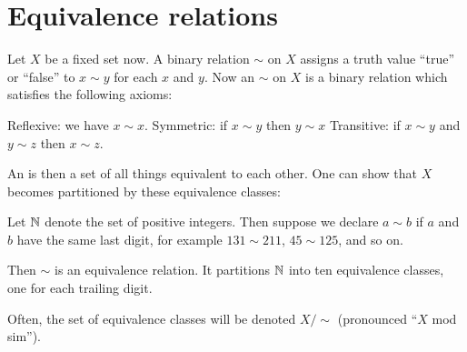 \section{Equivalence relations}
Let $X$ be a fixed set now.
A binary relation $\sim$ on $X$ assigns a truth value ``true''
or ``false'' to $x \sim y$ for each $x$ and $y$.
Now an  $\sim$ on $X$ is a binary relation
which satisfies the following axioms:
\begin{itemize}
	\ii Reflexive: we have $x \sim x$.
	\ii Symmetric: if $x \sim y$ then $y \sim x$
	\ii Transitive: if $x \sim y$ and $y \sim z$ then $x \sim z$.
\end{itemize}
An  is then a
set of all things equivalent to each other.
One can show that $X$ becomes partitioned by these equivalence classes:

\begin{example}
	Let $\mathbb N$ denote the set of positive integers.
	Then suppose we declare $a \sim b$ if $a$ and $b$ have the same last digit,
	for example $131 \sim 211$, $45 \sim 125$, and so on.

	Then $\sim$ is an equivalence relation.
	It partitions $\mathbb N$ into ten equivalence classes,
	one for each trailing digit.
\end{example}

Often, the set of equivalence classes will be denoted $X/{\sim}$
(pronounced ``$X$ mod sim'').
